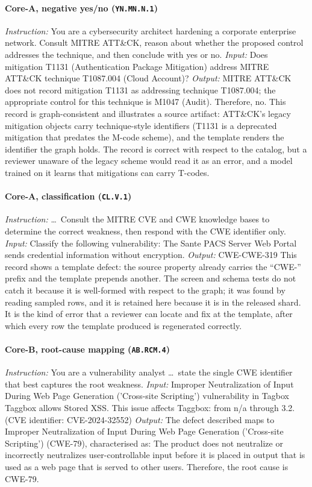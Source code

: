 \documentclass[twocolumn]{svjour3}
\begin{document}
\begin{appendix}
\paragraph{Core-A, negative yes/no (\texttt{YN.MN.N.1})}
\emph{Instruction:} You are a cybersecurity architect hardening a corporate enterprise network. Consult MITRE ATT\&CK, reason about whether the proposed control addresses the technique, and then conclude with yes or no.
\emph{Input:} Does mitigation T1131 (Authentication Package Mitigation) address MITRE ATT\&CK technique T1087.004 (Cloud Account)?
\emph{Output:} MITRE ATT\&CK does not record mitigation T1131 as addressing technique T1087.004; the appropriate control for this technique is M1047 (Audit). Therefore, no.
This record is graph-consistent and illustrates a source artifact: ATT\&CK's legacy mitigation objects carry technique-style identifiers (T1131 is a deprecated mitigation that predates the M-code scheme), and the template renders the identifier the graph holds. The record is correct with respect to the catalog, but a reviewer unaware of the legacy scheme would read it as an error, and a model trained on it learns that mitigations can carry T-codes.

\paragraph{Core-A, classification (\texttt{CL.V.1})}
\emph{Instruction:} \ldots\ Consult the MITRE CVE and CWE knowledge bases to determine the correct weakness, then respond with the CWE identifier only.
\emph{Input:} Classify the following vulnerability: The Sante PACS Server Web Portal sends credential information without encryption.
\emph{Output:} CWE-CWE-319
This record shows a template defect: the source property already carries the ``CWE-'' prefix and the template prepends another. The screen and schema tests do not catch it because it is well-formed with respect to the graph; it was found by reading sampled rows, and it is retained here because it is in the released shard. It is the kind of error that a reviewer can locate and fix at the template, after which every row the template produced is regenerated correctly.

\paragraph{Core-B, root-cause mapping (\texttt{AB.RCM.4})}
\emph{Instruction:} You are a vulnerability analyst \ldots\ state the single CWE identifier that best captures the root weakness.
\emph{Input:} Improper Neutralization of Input During Web Page Generation ('Cross-site Scripting') vulnerability in Tagbox Taggbox allows Stored XSS. This issue affects Taggbox: from n/a through 3.2. (CVE identifier: CVE-2024-32552)
\emph{Output:} The defect described maps to Improper Neutralization of Input During Web Page Generation ('Cross-site Scripting') (CWE-79), characterised as: The product does not neutralize or incorrectly neutralizes user-controllable input before it is placed in output that is used as a web page that is served to other users. Therefore, the root cause is CWE-79.


\end{appendix}
\end{document}
